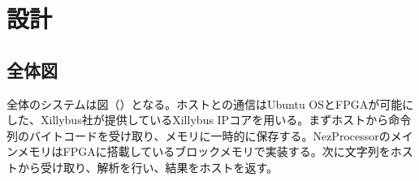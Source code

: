 \documentclass[paper]{ieicej}
\begin{document}





\section{設計}

\subsection{全体図}

全体のシステムは図（）となる。ホストとの通信はUbuntu OSとFPGAが可能にした、Xillybus社が提供しているXillybus IPコアを用いる。まずホストから命令列のバイトコードを受け取り、メモリに一時的に保存する。NezProcessorのメインメモリはFPGAに搭載しているブロックメモリで実装する。次に文字列をホストから受け取り、解析を行い、結果をホストを返す。
\end{document}
